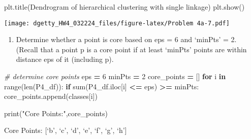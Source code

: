 \documentclass[
]{article}
\newenvironment{Shaded}{\begin{snugshade}}{\end{snugshade}}
\newcommand{\BuiltInTok}[1]{#1}
\newcommand{\CommentTok}[1]{\textcolor[rgb]{0.56,0.35,0.01}{\textit{#1}}}
\newcommand{\ControlFlowTok}[1]{\textcolor[rgb]{0.13,0.29,0.53}{\textbf{#1}}}
\newcommand{\DecValTok}[1]{\textcolor[rgb]{0.00,0.00,0.81}{#1}}
\newcommand{\KeywordTok}[1]{\textcolor[rgb]{0.13,0.29,0.53}{\textbf{#1}}}
\newcommand{\NormalTok}[1]{#1}
\newcommand{\OperatorTok}[1]{\textcolor[rgb]{0.81,0.36,0.00}{\textbf{#1}}}
\newcommand{\StringTok}[1]{\textcolor[rgb]{0.31,0.60,0.02}{#1}}
\providecommand{\tightlist}{%
  \setlength{\itemsep}{0pt}\setlength{\parskip}{0pt}}
\begin{document}
\begin{Shaded}
\begin{Highlighting}[]
\NormalTok{plt.title(}\StringTok{\textquotesingle{}Dendrogram of hierarchical clustering with single linkage\textquotesingle{}}\NormalTok{)}
\NormalTok{plt.show()}
\end{Highlighting}
\end{Shaded}

\texttt{[image: dgetty\_HW4\_032224\_files/figure-latex/Problem 4a-7.pdf]}

\begin{enumerate}
\def\labelenumi{(\alph{enumi})}
\setcounter{enumi}{1}
\tightlist
\item
  Determine whether a point is core based on eps = 6 and `minPts' = 2.
  (Recall that a point p is a core point if at least `minPts' points are
  within distance eps of it (including p).
\end{enumerate}

\begin{Shaded}
\begin{Highlighting}[]
\CommentTok{\# determine core points}
\NormalTok{eps }\OperatorTok{=} \DecValTok{6}
\NormalTok{minPts }\OperatorTok{=} \DecValTok{2}
\NormalTok{core\_points }\OperatorTok{=}\NormalTok{ []}
\ControlFlowTok{for}\NormalTok{ i }\KeywordTok{in} \BuiltInTok{range}\NormalTok{(}\BuiltInTok{len}\NormalTok{(P4\_df)):}
    \ControlFlowTok{if} \BuiltInTok{sum}\NormalTok{(P4\_df.iloc[i] }\OperatorTok{\textless{}=}\NormalTok{ eps) }\OperatorTok{\textgreater{}=}\NormalTok{ minPts:}
\NormalTok{        core\_points.append(classes[i])}
        
\BuiltInTok{print}\NormalTok{(}\StringTok{"Core Points:"}\NormalTok{,core\_points)}
\end{Highlighting}
\end{Shaded}

Core Points: {[}`b', `c', `d', `e', `f', `g', `h'{]}
\end{document}
